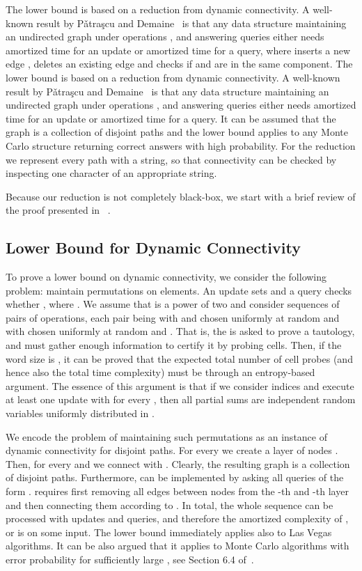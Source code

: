 \documentclass[a4paper]{article}
\newenvironment{shortv}{}{}
\theoremstyle{remark}
\begin{document}
The lower bound is based on a reduction from dynamic connectivity. A well-known
result by P\v{a}tra\c{s}cu and Demaine~\cite{logarithmic} is that any data structure maintaining
an undirected graph under operations ,  and answering queries
 either needs  amortized time for an update or
 amortized time for a query, where  inserts a new edge ,
 deletes an existing edge  and  checks if
 and  are in the same component.
\begin{shortv}
The lower bound is based on a reduction from dynamic connectivity. A well-known
result by P\v{a}tra\c{s}cu and Demaine~\cite{logarithmic} is that any data structure maintaining
an undirected graph under operations ,  and answering queries
 either needs  amortized time for an update or
 amortized time for a query.\end{shortv}
It can be assumed that the graph is
a collection of disjoint paths and the lower bound applies to any Monte Carlo structure returning
correct answers with high probability. For the reduction we represent every path with
a string, so that connectivity can be checked by inspecting one character of an appropriate string.

Because our reduction is not completely black-box,
we start with a brief review of the proof presented in ~\cite{logarithmic}.

\subsection{Lower Bound for Dynamic Connectivity}
To prove a lower bound on dynamic connectivity, we consider the following problem:
maintain  permutations  on
 elements. An update  sets  and a query
 checks whether ,
where .
We assume that  is a power of two and consider sequences
of  pairs of operations, each pair being 
with  and  chosen uniformly at random and  with
 chosen uniformly at random and .
That is, the  is asked to prove a tautology, and must gather enough information
to certify it by probing cells. Then, if the word size is ,
it can be proved that the expected total number of cell probes (and hence also the total time
complexity) must be  through an entropy-based argument. The essence
of this argument is that if we consider  indices 
and execute at least one update  with  for
every , then all partial sums  are independent random
variables uniformly distributed in .

We encode the problem of maintaining such  permutations
as an instance of dynamic connectivity for disjoint paths. For every 
we create a layer of  nodes . Then, for every
 and  we connect  with .
Clearly, the resulting graph is a collection of disjoint paths. Furthermore,
 can be implemented by asking all  queries of the form
.  requires first removing all edges
between nodes from the -th and -th layer and then connecting them
according to . In total, the whole sequence can be processed with  updates
and  queries, and therefore the amortized complexity of ,
 or  is  on some input. The lower bound
immediately applies also to Las Vegas algorithms. It can be also argued that it
applies to Monte Carlo algorithms with error probability  for sufficiently
large , see Section 6.4 of~\cite{logarithmic}.
\end{document}
